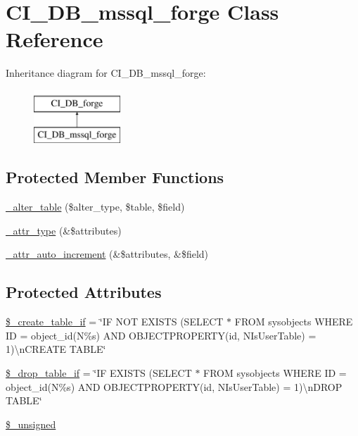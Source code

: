 \hypertarget{class_c_i___d_b__mssql__forge}{}\section{C\+I\+\_\+\+D\+B\+\_\+mssql\+\_\+forge Class Reference}
\label{class_c_i___d_b__mssql__forge}
Inheritance diagram for C\+I\+\_\+\+D\+B\+\_\+mssql\+\_\+forge\+:\begin{figure}[H]
\begin{center}
\leavevmode
\includegraphics[height=2.000000cm]{class_c_i___d_b__mssql__forge}
\end{center}
\end{figure}
\subsection*{Protected Member Functions}
\begin{DoxyCompactItemize}
\item 
\hyperlink{class_c_i___d_b__mssql__forge_a41c6cae02f2fda8b429ad0afb9509426}{\+\_\+alter\+\_\+table} (\$alter\+\_\+type, \$table, \$field)
\item 
\hyperlink{class_c_i___d_b__mssql__forge_a8553be952084c6f7cdfff370a1d14f6b}{\+\_\+attr\+\_\+type} (\&\$attributes)
\item 
\hyperlink{class_c_i___d_b__mssql__forge_a2a013a5932439c3c44f0dad3436525f7}{\+\_\+attr\+\_\+auto\+\_\+increment} (\&\$attributes, \&\$field)
\end{DoxyCompactItemize}
\subsection*{Protected Attributes}
\begin{DoxyCompactItemize}
\item 
\hyperlink{class_c_i___d_b__mssql__forge_a2f6484fcb8d1dc3eef67a637227cd583}{\$\+\_\+create\+\_\+table\+\_\+if} = \char`\"{}I\+F N\+O\+T E\+X\+I\+S\+T\+S (S\+E\+L\+E\+C\+T $\ast$ F\+R\+O\+M sysobjects W\+H\+E\+R\+E I\+D = object\+\_\+id(N\textquotesingle{}\%s\textquotesingle{}) A\+N\+D O\+B\+J\+E\+C\+T\+P\+R\+O\+P\+E\+R\+T\+Y(id, N\textquotesingle{}Is\+User\+Table\textquotesingle{}) = 1)\textbackslash{}n\+C\+R\+E\+A\+T\+E T\+A\+B\+L\+E\char`\"{}
\item 
\hyperlink{class_c_i___d_b__mssql__forge_a92a8a9145a7fc91e252e58d019373581}{\$\+\_\+drop\+\_\+table\+\_\+if} = \char`\"{}I\+F E\+X\+I\+S\+T\+S (S\+E\+L\+E\+C\+T $\ast$ F\+R\+O\+M sysobjects W\+H\+E\+R\+E I\+D = object\+\_\+id(N\textquotesingle{}\%s\textquotesingle{}) A\+N\+D O\+B\+J\+E\+C\+T\+P\+R\+O\+P\+E\+R\+T\+Y(id, N\textquotesingle{}Is\+User\+Table\textquotesingle{}) = 1)\textbackslash{}n\+D\+R\+O\+P T\+A\+B\+L\+E\char`\"{}
\item 
\hyperlink{class_c_i___d_b__mssql__forge_aae977ae6d61fa183f0b25422b6ddc31c}{\$\+\_\+unsigned}
\end{DoxyCompactItemize}
